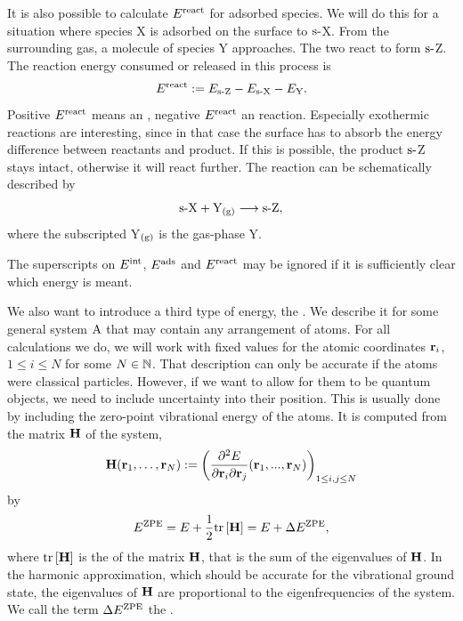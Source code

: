 \documentclass[8.5pt,twoside,twocolumn]{article}
\newcommand\zpe{\enmat{\te{ZPE}}}
\newcommand\eint{\enmat{E^{\te{int}}}}
\newcommand\eads{\enmat{E^{\te{ads}}}}
\newcommand\ere{\enmat{E^{\te{react}}}}
\newcommand\ezp{\enmat{E^{\zpe}}}
\newcommand\sur{\enmat{\te{s-}}}
\newcommand\gas{\enmat{_\te{(g)}}}
\renewcommand\H{\enmat{\bo H}}
\renewcommand\r{\bo r}
\theoremstyle{standard}
\begin{document}
It is also possible to calculate  $\ere$ for adsorbed species. We will
do this for a situation where species X is adsorbed on the surface to $\sur$X. From the
surrounding gas, a molecule of species Y approaches. The two react to form $\sur$Z. The
reaction energy consumed or released in this process is
\begin{equation}
 \ere:= E_{\sur\te Z} - E_{\sur\X} - E_\Y.
 \label{Theo:ReactionEnergySurface}
\end{equation}
Positive $\ere$ means an , negative $\ere$ an  reaction. Especially
exothermic reactions are interesting, since in that case the surface has to absorb the 
energy difference between reactants and product. If this is possible, the product $\sur$Z
stays intact, otherwise it will react further. The reaction can be schematically
described by
\begin{equation}
 \sur\X+\Y\gas \chemar  \sur\te Z,
 \label{Theo:ReactionScheme}
\end{equation} 
where the subscripted Y$\gas$ is the gas-phase Y. 

The superscripts on $\eint$, $\eads$ and $\ere$ may be ignored if it is sufficiently clear which energy 
is meant.

We also want to introduce a third type of energy, the .
We describe it for some general system $\text A$ that may contain any arrangement of atoms.
For all calculations we do, we will work with fixed values for the atomic coordinates
$\r_i$, $1 \le i \le N$ for some $N \in \mathbb{N}$. That description can only be accurate if
the atoms were classical particles. However, if we want to allow for them to be
quantum objects, we need to include uncertainty into their position. This is usually
done by including the zero-point vibrational energy of the atoms. It is computed from the
 matrix $\H$ of the system,
\begin{equation}
 \H(\r_1,\ldots,\r_N) := \rb{\deri {^2 E} {\r_i \del \r_j} (\r_1,...,\r_N) }_{1\le i,j \le N}
 \label{Theo:Hessian}
\end{equation}
by
\begin{equation}
 \ezp=E + \frac 1 2 \te {tr} \ed{\H} = E + \Dl \ezp,
 \label{Theo:EZP}
\end{equation}
where $\te {tr} \ed{\H}$ is the  of the matrix $\H$, that is the sum of the eigenvalues
of $\H$. In the harmonic approximation, which should be accurate for the vibrational ground 
state, the eigenvalues of $\H$ are 
proportional
to the eigenfrequencies of the system. We call the term $\Dl \ezp$ the .
\end{document}
